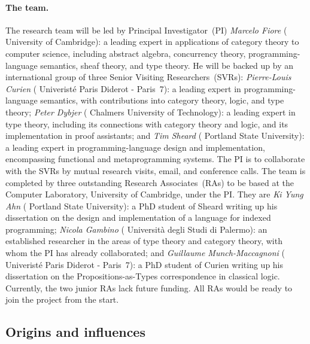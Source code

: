 \documentclass[11pt,twocolumn]{article}
\begin{document}
\paragraph*{The team.}

The research team will be led by Principal Investigator~(PI) \emph{Marcelo
Fiore} (%
University of Cambridge): 
    a leading expert in applications of category theory to computer science,
    including abstract algebra, concurrency theory, programming-language
    semantics, sheaf theory, and type theory.  
He will be backed up by an international group of three Senior Visiting
Researchers~(SVRs): \emph{Pierre-Louis Curien} (%
Univerist\'e Paris Diderot - Paris~7): 
  a leading expert in programming-language semantics, with contributions into
  category theory, logic, %
  and type theory; 
  \emph{Peter Dybjer} (%
Chalmers University of Technology): 
  a leading expert in type theory, including its connections with category
  theory and logic, and its implementation in proof assistants; and 
  \emph{Tim Sheard} (%
Portland State University): 
  a leading expert in pro\-gram\-ming-language design and implementation,
  encompassing functional and metaprogramming systems. 
%
The PI is to collaborate with the SVRs by mutual research visits, email, and
conference calls.
%
The team is completed by three outstanding Research Associates~(RAs) to be
based at the Computer Laboratory, University of Cambridge, under the PI.  They
are
  \emph{Ki Yung Ahn} (%
Portland State University): 
  a PhD student of Sheard writing up his dissertation on the design and
  implementation of a language for indexed programming;
  \emph{Nicola Gambino} (%
Universit\`a degli Studi di Palermo):  
  an established researcher in the areas of type theory and category theory,
  with whom the PI has already collaborated; and 
  \emph{Guillaume Munch-Maccagnoni} (%
Univerist\'e Paris Diderot - Paris~7): 
  a PhD student of Curien writing up his dissertation on the
  Propositions-as-Types correspondence in classical logic.
Currently, the two junior RAs lack future funding.  All RAs would be ready
to join the project from the start.

\subsection{Origins and influences}
\label{Origins}
\end{document}
